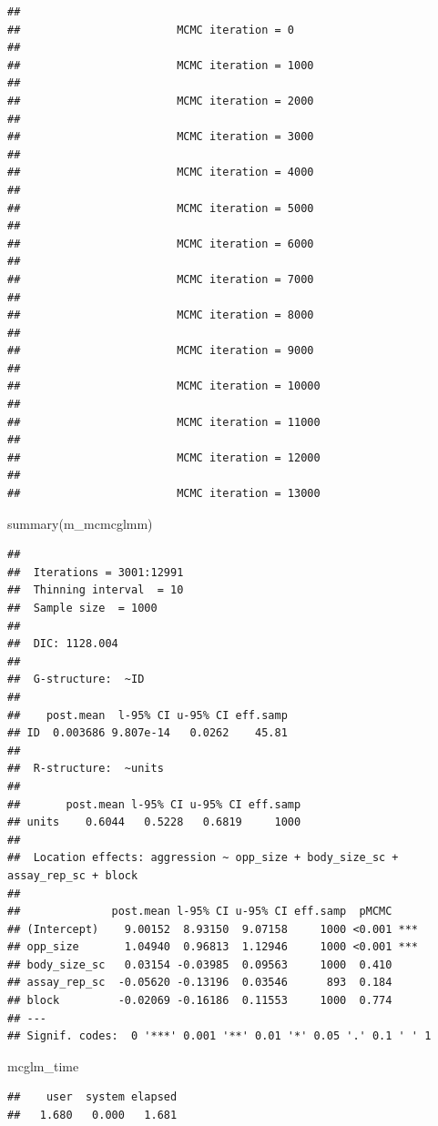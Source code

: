 \documentclass[
  12pt,
]{book}
\newenvironment{Shaded}{\begin{snugshade}}{\end{snugshade}}
\newcommand{\FunctionTok}[1]{\textcolor[rgb]{0.00,0.00,0.00}{#1}}
\newcommand{\NormalTok}[1]{#1}
\begin{document}
\begin{verbatim}
## 
##                        MCMC iteration = 0
## 
##                        MCMC iteration = 1000
## 
##                        MCMC iteration = 2000
## 
##                        MCMC iteration = 3000
## 
##                        MCMC iteration = 4000
## 
##                        MCMC iteration = 5000
## 
##                        MCMC iteration = 6000
## 
##                        MCMC iteration = 7000
## 
##                        MCMC iteration = 8000
## 
##                        MCMC iteration = 9000
## 
##                        MCMC iteration = 10000
## 
##                        MCMC iteration = 11000
## 
##                        MCMC iteration = 12000
## 
##                        MCMC iteration = 13000
\end{verbatim}

\begin{Shaded}
\begin{Highlighting}[]
\FunctionTok{summary}\NormalTok{(m\_mcmcglmm)}
\end{Highlighting}
\end{Shaded}

\begin{verbatim}
## 
##  Iterations = 3001:12991
##  Thinning interval  = 10
##  Sample size  = 1000 
## 
##  DIC: 1128.004 
## 
##  G-structure:  ~ID
## 
##    post.mean  l-95% CI u-95% CI eff.samp
## ID  0.003686 9.807e-14   0.0262    45.81
## 
##  R-structure:  ~units
## 
##       post.mean l-95% CI u-95% CI eff.samp
## units    0.6044   0.5228   0.6819     1000
## 
##  Location effects: aggression ~ opp_size + body_size_sc + assay_rep_sc + block 
## 
##              post.mean l-95% CI u-95% CI eff.samp  pMCMC    
## (Intercept)    9.00152  8.93150  9.07158     1000 <0.001 ***
## opp_size       1.04940  0.96813  1.12946     1000 <0.001 ***
## body_size_sc   0.03154 -0.03985  0.09563     1000  0.410    
## assay_rep_sc  -0.05620 -0.13196  0.03546      893  0.184    
## block         -0.02069 -0.16186  0.11553     1000  0.774    
## ---
## Signif. codes:  0 '***' 0.001 '**' 0.01 '*' 0.05 '.' 0.1 ' ' 1
\end{verbatim}

\begin{Shaded}
\begin{Highlighting}[]
\NormalTok{mcglm\_time}
\end{Highlighting}
\end{Shaded}

\begin{verbatim}
##    user  system elapsed 
##   1.680   0.000   1.681
\end{verbatim}
\end{document}
